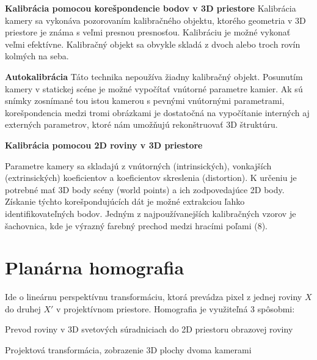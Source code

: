 \textbf{Kalibrácia pomocou korešpondencie bodov v 3D priestore}\newline
Kalibrácia kamery sa vykonáva pozorovaním kalibračného objektu, ktorého geometria v 3D priestore je známa s veľmi presnou presnosťou. Kalibráciu je možné vykonať veľmi efektívne. Kalibračný objekt sa obvykle skladá z dvoch alebo troch rovín kolmých na seba.

\textbf{Autokalibrácia}
Táto technika nepoužíva žiadny kalibračný objekt. Posunutím kamery v statickej scéne je možné vypočítať vnútorné parametre kamier. Ak sú snímky zosnímané tou istou kamerou s pevnými vnútornými parametrami, korešpondencia medzi tromi obrázkami je dostatočná na vypočítanie interných aj externých parametrov, ktoré nám umožňujú rekonštruovať 3D štruktúru. 

\textbf{Kalibrácia pomocou 2D roviny v 3D priestore}




Parametre kamery sa skladajú z vnútorných (intrinsických), vonkajších (extrinsických) koeficientov a koeficientov skreslenia (distortion). K určeniu je potrebné mať 3D body scény (world points) a ich zodpovedajúce 2D body. Získanie týchto korešpondujúcích dát je možné extrakciou ľahko identifikovateľných bodov. Jedným z najpoužívanejších kalibračných vzorov je šachovnica, kde je výrazný farebný prechod medzi hracími poľami (8).



\section{Planárna homografia}
Ide o lineárnu perspektívnu transformáciu, ktorá prevádza pixel z jednej roviny $X$ do druhej $X'$ v projektívnom priestore. 
Homografia je využiteľná 3 spôsobmi:

\begin{description}[leftmargin=*,labelsep=5.8mm, font=$\bullet$~\normalfont\scshape\color{black}]
	\item Prevod roviny v 3D svetových súradniciach do 2D priestoru obrazovej roviny
	\item Projektová transformácia, zobrazenie 3D plochy dvoma kamerami
\end{description}

